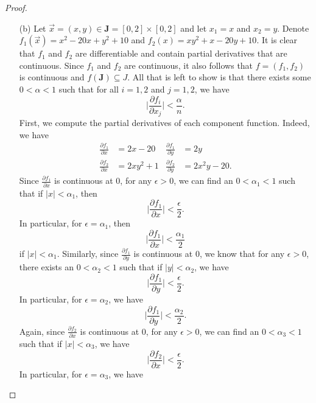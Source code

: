 \documentclass[a4paper]{article}
\begin{document}
\begin{proof}
\begin{enumerate}
    \item[(b)] Let \( \vec{ x }  =  (x,y) \in \textbf{J} = [0,2] \times [0,2]   \) and let \( {x}_{1} = x  \) and \( {x}_{2} = y \). Denote \( {f}_{1}(\vec{ x }) = x^{2} - 20 x + y^{2} + 10   \) and \( {f}_{2}(x) = x y^{2} + x -20 y + 10 \). It is clear that \( {f}_{1} \) and \( {f}_{2} \) are differentiable and contain partial derivatives that are continuous. Since \( {f}_{1} \) and \( {f}_{2} \) are continuous, it also follows that \( f  = ({f}_{1}, {f}_{2}) \) is continuous and \( f(\textbf{J}) \subseteq J \). All that is left to show is that there exists some \( 0 < \alpha < 1  \) such that for all \( i = 1,2 \) and \( j = 1,2 \), we have
        \[ \Big|  \frac{\partial {f}_{i} }{\partial {x}_{j} }  \Big|  < \frac{ \alpha }{ n }.  \]
        First, we compute the partial derivatives of each component function. Indeed, we have 
        \begin{align*}
            \frac{\partial {f}_{1} }{\partial x  }  &= 2x - 20 &\frac{\partial {f}_{1} }{\partial y }  &= 2y \\
            \frac{\partial {f}_{2} }{\partial x }  &= 2x y^{2} + 1 &\frac{\partial {f}_{2} }{\partial y }  &= 2 x^{2} y - 20.
        \end{align*}
        Since \( \frac{\partial {f}_{1} }{\partial x }  \) is continuous at \( 0  \), for any \( \epsilon > 0  \),  we can find an \( 0 < \alpha_1 < 1  \) such that if \( | x  | < {\alpha}_{1} \), then 
        \[  \Big| \frac{\partial {f}_{1} }{\partial x }  \Big| < \frac{ \epsilon }{ 2  }.  \]
        In particular, for \( \epsilon = {\alpha}_{1} \), then
        \[  \Big| \frac{\partial {f}_{1} }{\partial x  }  \Big| < \frac{ {\alpha}_{1} }{ 2 } \tag{1} \]
        if \( | x  |  < {\alpha}_{1} \). Similarly, since \( \frac{\partial {f}_{1} }{\partial y }  \) is continuous at \( 0  \), we know that for any \( \epsilon > 0  \), there exists an \( 0 < {\alpha}_{2} < 1  \) such that if \( | y  |  < {\alpha}_{2} \), we have 
        \[ \Big| \frac{\partial {f}_{1} }{\partial y }  \Big| < \frac{ \epsilon }{ 2 }.   \]
        In particular, for \( \epsilon = {\alpha}_{2}  \), we have 
        \[  \Big| \frac{\partial {f}_{1} }{\partial y }  \Big| < \frac{ {\alpha}_{2} }{ 2  }. \tag{2}  \]
        Again, since \( \frac{\partial {f}_{2} }{\partial x  }   \) is continuous at \( 0 \), for any \( \epsilon > 0  \),  we can find an \( 0 < {\alpha}_{3} < 1  \) such that if \( | x  |  < {\alpha}_{3} \), we have 
        \[  \Big| \frac{\partial {f}_{2} }{\partial x }  \Big| < \frac{ \epsilon}{ 2 }. \]
        In particular, for \( \epsilon = {\alpha}_{3} \), we have 

\end{enumerate}
\end{proof}
\end{document}
